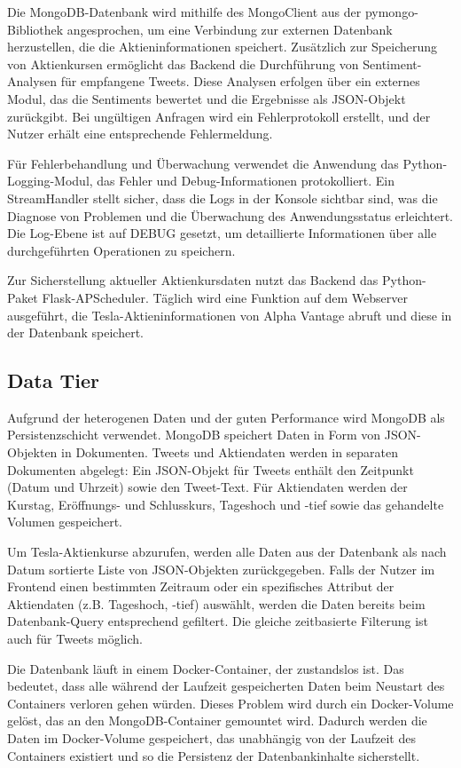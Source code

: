 \documentclass[conference,a4paper,flushend]{cs-techrep}
\begin{document}
Die MongoDB-Datenbank wird mithilfe des MongoClient aus der pymongo-Bibliothek angesprochen, um eine Verbindung zur externen Datenbank herzustellen, die die Aktieninformationen speichert. Zusätzlich zur Speicherung von Aktienkursen ermöglicht das Backend die Durchführung von Sentiment-Analysen für empfangene Tweets. Diese Analysen erfolgen über ein externes Modul, das die Sentiments bewertet und die Ergebnisse als JSON-Objekt zurückgibt. Bei ungültigen Anfragen wird ein Fehlerprotokoll erstellt, und der Nutzer erhält eine entsprechende Fehlermeldung.

Für Fehlerbehandlung und Überwachung verwendet die Anwendung das Python-Logging-Modul, das Fehler und Debug-Informationen protokolliert. Ein StreamHandler stellt sicher, dass die Logs in der Konsole sichtbar sind, was die Diagnose von Problemen und die Überwachung des Anwendungsstatus erleichtert. Die Log-Ebene ist auf DEBUG gesetzt, um detaillierte Informationen über alle durchgeführten Operationen zu speichern.

Zur Sicherstellung aktueller Aktienkursdaten nutzt das Backend das Python-Paket Flask-APScheduler. Täglich wird eine Funktion auf dem Webserver ausgeführt, die Tesla-Aktieninformationen von Alpha Vantage abruft und diese in der Datenbank speichert.




\subsection{Data Tier}
Aufgrund der heterogenen Daten und der guten Performance wird MongoDB als Persistenzschicht verwendet. MongoDB speichert Daten in Form von JSON-Objekten in Dokumenten. Tweets und Aktiendaten werden in separaten Dokumenten abgelegt: Ein JSON-Objekt für Tweets enthält den Zeitpunkt (Datum und Uhrzeit) sowie den Tweet-Text. Für Aktiendaten werden der Kurstag, Eröffnungs- und Schlusskurs, Tageshoch und -tief sowie das gehandelte Volumen gespeichert.

Um Tesla-Aktienkurse abzurufen, werden alle Daten aus der Datenbank als nach Datum sortierte Liste von JSON-Objekten zurückgegeben. Falls der Nutzer im Frontend einen bestimmten Zeitraum oder ein spezifisches Attribut der Aktiendaten (z.B. Tageshoch, -tief) auswählt, werden die Daten bereits beim Datenbank-Query entsprechend gefiltert. Die gleiche zeitbasierte Filterung ist auch für Tweets möglich.

Die Datenbank läuft in einem Docker-Container, der zustandslos ist. Das bedeutet, dass alle während der Laufzeit gespeicherten Daten beim Neustart des Containers verloren gehen würden. Dieses Problem wird durch ein Docker-Volume gelöst, das an den MongoDB-Container gemountet wird. Dadurch werden die Daten im Docker-Volume gespeichert, das unabhängig von der Laufzeit des Containers existiert und so die Persistenz der Datenbankinhalte sicherstellt.
\end{document}
